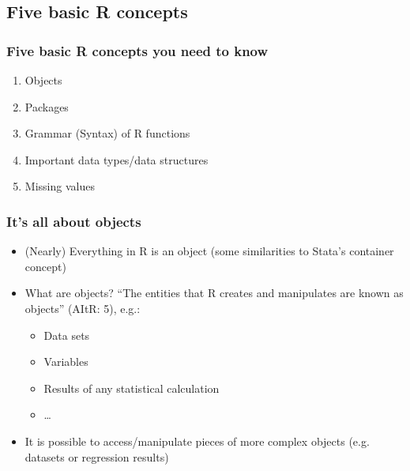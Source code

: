 \documentclass[bigger]{beamer}
\begin{document}
\subsection{Five basic R concepts}
\label{sec-1-2}
\begin{frame}
\frametitle{Five basic R concepts you need to know}
\label{sec-1-2-1}

\begin{enumerate}
\item Objects
\item Packages
\item Grammar (Syntax) of R functions
\item Important data types/data structures
\item Missing values
\end{enumerate}
\end{frame}
\begin{frame}
\frametitle{It's all about objects}
\label{sec-1-2-2}

\begin{itemize}
\item (Nearly) Everything in R is an object (some similarities to Stata's
      container concept)
\item What are objects? \enquote{The entities that R creates and manipulates are known as objects} (AItR: 5), e.g.:
\begin{itemize}
\item Data sets
\item Variables
\item Results of any statistical calculation
\item \ldots
\end{itemize}
\item It is possible to access/manipulate pieces of more complex objects (e.g. datasets or regression results)
\end{itemize}
\end{frame}
\end{document}

